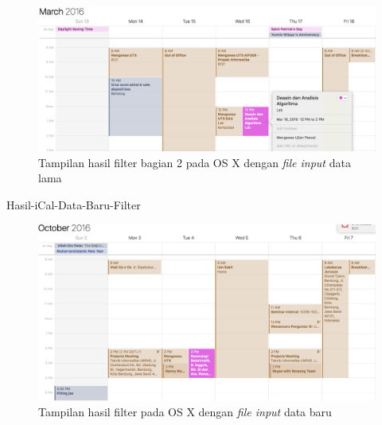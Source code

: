 			\begin{figure}[H]
			\centering
			\includegraphics[scale=0.4]{Gambar/Hasil-Import-Filter-2-on-Mac}
			\caption{Tampilan hasil filter bagian 2 pada OS X dengan \textit{file input} data lama}
			\label{fig:Hasil-Import-Filter-2-on-Mac}
			\end{figure}
			
			Hasil-iCal-Data-Baru-Filter
			\begin{figure}[H]
			\centering
			\includegraphics[scale=0.4]{Gambar/Hasil-iCal-Data-Baru-Filter}
			\caption{Tampilan hasil filter pada OS X dengan \textit{file input} data baru}
			\label{fig:Hasil-iCal-Data-Baru-Filter}
			\end{figure}
		
